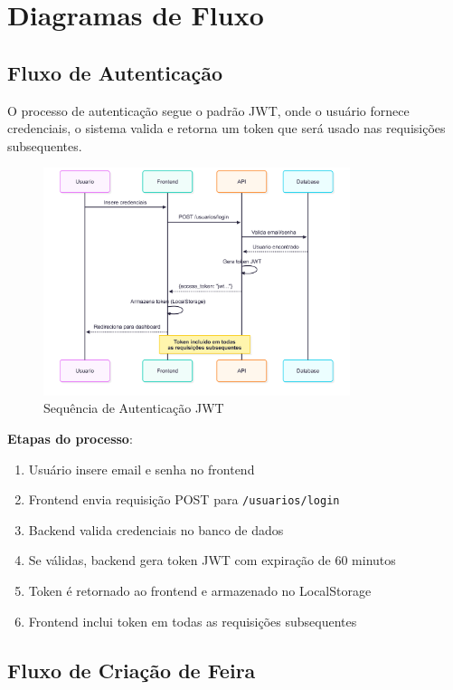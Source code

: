 \documentclass[12pt,a4paper]{article}
\begin{document}
\section{Diagramas de Fluxo}

\subsection{Fluxo de Autenticação}

O processo de autenticação segue o padrão JWT, onde o usuário fornece credenciais, o sistema valida e retorna um token que será usado nas requisições subsequentes.

\begin{figure}[h]
    \centering
    \includegraphics[width=0.8\textwidth]{diagrams/fluxo_autenticacao.png}
    \caption{Sequência de Autenticação JWT}
    \label{fig:fluxo_autenticacao}
\end{figure}

\textbf{Etapas do processo}:
\begin{enumerate}
    \item Usuário insere email e senha no frontend
    \item Frontend envia requisição POST para \texttt{/usuarios/login}
    \item Backend valida credenciais no banco de dados
    \item Se válidas, backend gera token JWT com expiração de 60 minutos
    \item Token é retornado ao frontend e armazenado no LocalStorage
    \item Frontend inclui token em todas as requisições subsequentes
\end{enumerate}

\subsection{Fluxo de Criação de Feira}
\end{document}
